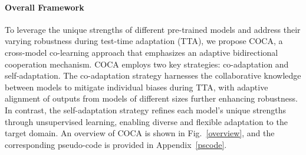 \vspace{-11pt}\paragraph{Overall Framework} To leverage the unique strengths of different pre-trained models and address their varying robustness during test-time adaptation (TTA), we propose COCA, a cross-model co-learning approach that emphasizes an adaptive bidirectional cooperation mechanism. COCA employs two key strategies: co-adaptation and self-adaptation. The co-adaptation strategy harnesses the collaborative knowledge between models to mitigate individual biases during TTA, with adaptive alignment of outputs from models of different sizes further enhancing robustness. In contrast, the self-adaptation strategy refines each model’s unique strengths through unsupervised learning, enabling diverse and flexible adaptation to the target domain. An overview of COCA is shown in Fig.~\ref{overview}, and the corresponding pseudo-code is provided in Appendix~\ref{pscode}.





